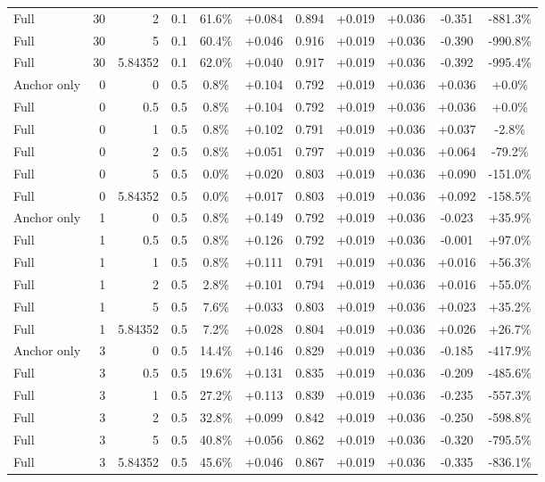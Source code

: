 \begin{table}[htbp]
\begin{tabular}{lrrrccccccc}
Full & 30 & 2 & 0.1 & 61.6\% & +0.084 & 0.894 & +0.019 & +0.036 & -0.351 & -881.3\% \\
Full & 30 & 5 & 0.1 & 60.4\% & +0.046 & 0.916 & +0.019 & +0.036 & -0.390 & -990.8\% \\
Full & 30 & 5.84352 & 0.1 & 62.0\% & +0.040 & 0.917 & +0.019 & +0.036 & -0.392 & -995.4\% \\
Anchor only & 0 & 0 & 0.5 & 0.8\% & +0.104 & 0.792 & +0.019 & +0.036 & +0.036 & +0.0\% \\
Full & 0 & 0.5 & 0.5 & 0.8\% & +0.104 & 0.792 & +0.019 & +0.036 & +0.036 & +0.0\% \\
Full & 0 & 1 & 0.5 & 0.8\% & +0.102 & 0.791 & +0.019 & +0.036 & +0.037 & -2.8\% \\
Full & 0 & 2 & 0.5 & 0.8\% & +0.051 & 0.797 & +0.019 & +0.036 & +0.064 & -79.2\% \\
Full & 0 & 5 & 0.5 & 0.0\% & +0.020 & 0.803 & +0.019 & +0.036 & +0.090 & -151.0\% \\
Full & 0 & 5.84352 & 0.5 & 0.0\% & +0.017 & 0.803 & +0.019 & +0.036 & +0.092 & -158.5\% \\
Anchor only & 1 & 0 & 0.5 & 0.8\% & +0.149 & 0.792 & +0.019 & +0.036 & -0.023 & +35.9\% \\
Full & 1 & 0.5 & 0.5 & 0.8\% & +0.126 & 0.792 & +0.019 & +0.036 & -0.001 & +97.0\% \\
Full & 1 & 1 & 0.5 & 0.8\% & +0.111 & 0.791 & +0.019 & +0.036 & +0.016 & +56.3\% \\
Full & 1 & 2 & 0.5 & 2.8\% & +0.101 & 0.794 & +0.019 & +0.036 & +0.016 & +55.0\% \\
Full & 1 & 5 & 0.5 & 7.6\% & +0.033 & 0.803 & +0.019 & +0.036 & +0.023 & +35.2\% \\
Full & 1 & 5.84352 & 0.5 & 7.2\% & +0.028 & 0.804 & +0.019 & +0.036 & +0.026 & +26.7\% \\
Anchor only & 3 & 0 & 0.5 & 14.4\% & +0.146 & 0.829 & +0.019 & +0.036 & -0.185 & -417.9\% \\
Full & 3 & 0.5 & 0.5 & 19.6\% & +0.131 & 0.835 & +0.019 & +0.036 & -0.209 & -485.6\% \\
Full & 3 & 1 & 0.5 & 27.2\% & +0.113 & 0.839 & +0.019 & +0.036 & -0.235 & -557.3\% \\
Full & 3 & 2 & 0.5 & 32.8\% & +0.099 & 0.842 & +0.019 & +0.036 & -0.250 & -598.8\% \\
Full & 3 & 5 & 0.5 & 40.8\% & +0.056 & 0.862 & +0.019 & +0.036 & -0.320 & -795.5\% \\
Full & 3 & 5.84352 & 0.5 & 45.6\% & +0.046 & 0.867 & +0.019 & +0.036 & -0.335 & -836.1\% \\

\end{tabular}
\end{table}
